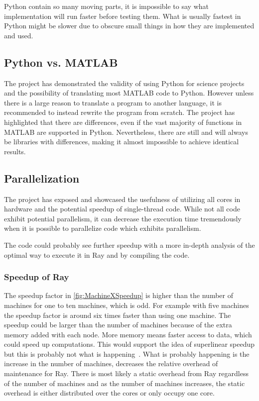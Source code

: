 \documentclass[12pt, a4paper]{article}
\begin{document}
Python contain so many moving parts, it is impossible to say what implementation will run faster before testing them.
What is usually fastest in Python might be slower due to obscure small things in how they are implemented and used.

\subsection{Python vs. MATLAB}

The project has demonstrated the validity of using Python for science projects and the possibility of translating most MATLAB code to Python.
However unless there is a large reason to translate a program to another language, it is recommended to instead rewrite the program from scratch.
The project has highlighted that there are differences, even if the vast majority of functions in MATLAB are supported in Python.
Nevertheless, there are still and will always be libraries with differences, making it almost impossible to achieve identical results.

\subsection{Parallelization}

The project has exposed and showcased the usefulness of utilizing all cores in hardware and the potential speedup of single-thread code.
While not all code exhibit potential parallelism, it can decrease the execution time tremendously when it is possible to parallelize code which exhibits parallelism.

The code could probably see further speedup with a more in-depth analysis of the optimal way to execute it in Ray and by compiling the code.

\subsubsection{Speedup of Ray}\label{RaySpeedup}

The speedup factor in \cref{fig:MachineXSpeedup} is higher than the number of machines for one to ten machines, which is odd.
For example with five machines the speedup factor is around six times faster than using one machine.
The speedup could be larger than the number of machines because of the extra memory added with each node.
More memory means faster access to data, which could speed up computations.
This would support the idea of superlinear speedup but this is probably not what is happening~\cite{superlinearSPEED}.
What is probably happening is the increase in the number of machines, decreases the relative overhead of maintenance for Ray.
There is most likely a static overhead from Ray regardless of the number of machines and as the number of machines increases, the static overhead is either distributed over the cores or only occupy one core.
\end{document}

